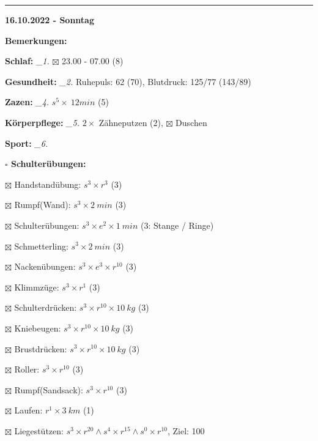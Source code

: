\documentclass[10pt,a4paper]{article}
\newcommand\prop[1] {{\color {alizarin} {\bf #1}}}             %
\newcommand\rele[1] {{\color {english} \bf {#1}}}              %
\newcommand\mand[1] {{\color {burntorange} {\bf #1}}}          %
\newcommand\ddivide {\vskip -9pt \hrule \vskip 6pt}
\newcommand\topspace{\vskip -15pt \hskip 20pt}
\newcommand\n[1] { {\sl #1.} \hskip 5pt }
\begin{document}
\ddivide
{\rele {16.10.2022 - Sonntag}}
       
\begin{mdframed}[style=daystyle]
  \begin{labeling}{{\mand {Bemerkungen:}}}
    \setlength\itemsep{-3pt}
  \item[{\mand {Schlaf:}}]        \n{\_1} $\boxtimes$ 23.00 - 07.00 (8)
  \item[{\mand {Gesundheit:}}]    \n{\_2} Ruhepuls: 62 (70), Blutdruck: 125/77 (143/89)
  \item[{\mand {Zazen:}}]         \n{\_4} $s^5 \times\ 12 min$ (5)
  \item[{\mand {Körperpflege:}}]  \n{\_5} $2 \times$ Zähneputzen (2), $\boxtimes$ Duschen
  \item[{\mand {Sport:}}]         \n{\_6}
    \topspace
    \begin{minipage}{0.75\textwidth}  
      \begin{labeling}{\prop {$\square$ {Schulterübungen:}}} 
        \setlength\itemsep{-3pt}
      \item[$\boxtimes$ Handstandübung:]  $s^3 \times r^{3}$ (3)
      \item[$\boxtimes$ Rumpf(Wand):]     $s^3 \times 2\ min$ (3)
      \item[$\boxtimes$ Schulterübungen:] $s^3 \times e^2 \times 1\ min$ (3: Stange / Ringe)
      \item[$\boxtimes$ Schmetterling:]   $s^3 \times 2\ min$ (3)
      \item[$\boxtimes$ Nackenübungen:]   $s^3 \times e^3 \times r^{10}$ (3)
      \item[$\boxtimes$ Klimmzüge:]       $s^3 \times r^1$ (3)
      \item[$\boxtimes$ Schulterdrücken:] $s^3 \times r^{10} \times 10\ kg$ (3)
      \item[$\boxtimes$ Kniebeugen:]      $s^3 \times r^{10} \times 10\ kg$ (3)
      \item[$\boxtimes$ Brustdrücken:]    $s^3 \times r^{10} \times 10\ kg$ (3)
      \item[$\boxtimes$ Roller:]          $s^3 \times r^{10}$ (3)
      \item[$\boxtimes$ Rumpf(Sandsack):] $s^3 \times r^{10}$ (3)
      \item[$\boxtimes$ Laufen:]          $r^1 \times 3\ km$ (1)
      \item[$\boxtimes$ Liegestützen:]    $s^3 \times r^{20} \land s^4 \times r^{15} \land s^0 \times r^{10}$, Ziel: 100
      \end{labeling}

\end{minipage}
\end{labeling}
\end{mdframed}
\end{document}
